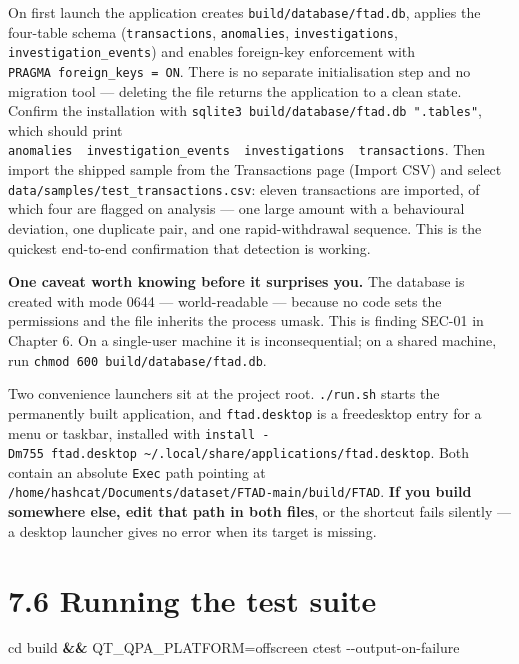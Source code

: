 \documentclass[
  12pt,
]{report}
\newenvironment{Shaded}{}{}
\newcommand{\AttributeTok}[1]{\textcolor[rgb]{0.49,0.56,0.16}{#1}}
\newcommand{\BuiltInTok}[1]{\textcolor[rgb]{0.00,0.50,0.00}{#1}}
\newcommand{\ExtensionTok}[1]{#1}
\newcommand{\KeywordTok}[1]{\textcolor[rgb]{0.00,0.44,0.13}{\textbf{#1}}}
\newcommand{\NormalTok}[1]{#1}
\newcommand{\OperatorTok}[1]{\textcolor[rgb]{0.40,0.40,0.40}{#1}}
\newcommand{\VariableTok}[1]{\textcolor[rgb]{0.10,0.09,0.49}{#1}}
\begin{document}
On first launch the application creates \texttt{build/\allowbreak{}database/\allowbreak{}ftad.db},
applies the four-table schema (\texttt{transactions},
\texttt{anomalies}, \texttt{investigations},
\texttt{investigation\_events}) and enables foreign-key enforcement with
\texttt{PRAGMA\ foreign\_keys\ =\ ON}. There is no separate
initialisation step and no migration tool --- deleting the file returns
the application to a clean state. Confirm the installation with
\texttt{sqlite3\ build/\allowbreak{}database/\allowbreak{}ftad.db\ ".tables"}, which should print
\texttt{anomalies\ \ investigation\_events\ \ investigations\ \ transactions}.
Then import the shipped sample from the Transactions page (Import CSV)
and select \texttt{data/\allowbreak{}samples/\allowbreak{}test\_transactions.csv}: eleven
transactions are imported, of which four are flagged on analysis --- one
large amount with a behavioural deviation, one duplicate pair, and one
rapid-withdrawal sequence. This is the quickest end-to-end confirmation
that detection is working.

\textbf{One caveat worth knowing before it surprises you.} The database
is created with mode 0644 --- world-readable --- because no code sets
the permissions and the file inherits the process umask. This is finding
SEC-01 in Chapter 6. On a single-user machine it is inconsequential; on
a shared machine, run \texttt{chmod\ 600\ build/\allowbreak{}database/\allowbreak{}ftad.db}.

Two convenience launchers sit at the project root. \texttt{./\allowbreak{}run.sh}
starts the permanently built application, and \texttt{ftad.desktop} is a
freedesktop entry for a menu or taskbar, installed with
\texttt{install\ -Dm755\ ftad.desktop\ \textasciitilde{}/.local/share/applications/ftad.desktop}.
Both contain an absolute \texttt{Exec} path pointing at
\texttt{/\allowbreak{}home/\allowbreak{}hashcat/\allowbreak{}Documents/\allowbreak{}dataset/\allowbreak{}FTAD-main/\allowbreak{}build/\allowbreak{}FTAD}.
\textbf{If you build somewhere else, edit that path in both files}, or
the shortcut fails silently --- a desktop launcher gives no error when
its target is missing.

\section{7.6 Running the test suite}\label{running-the-test-suite}

\begin{Shaded}
\begin{Highlighting}[]
\BuiltInTok{cd}\NormalTok{ build }\KeywordTok{\&\&} \VariableTok{QT\_QPA\_PLATFORM}\OperatorTok{=}\NormalTok{offscreen }\ExtensionTok{ctest} \AttributeTok{{-}{-}output{-}on{-}failure}
\end{Highlighting}
\end{Shaded}
\end{document}
